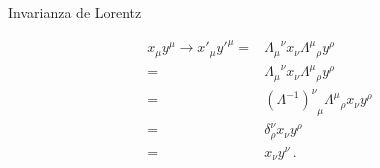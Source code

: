 \begin{frame}
\begin{example}
  


Invarianza de Lorentz

  \begin{align}
    x_\mu y^\mu\to x'_\mu{y'}^\mu=&{\Lambda_\mu}^\nu x_\nu{\Lambda^\mu}_\rho y^\rho \nonumber\\
    =&{\Lambda_\mu}^\nu x_\nu{\Lambda^\mu}_\rho y^\rho \nonumber\\
    =&{\left(\Lambda^{-1}\right)^\nu}_\mu{\Lambda^\mu}_\rho x_\nu y^\rho \nonumber\\
    =&\delta^\nu_\rho x_\nu y^\rho \nonumber\\
    =&x_\nu y^\nu \nonumber\,.
  \end{align}

\end{example}

\end{frame}


